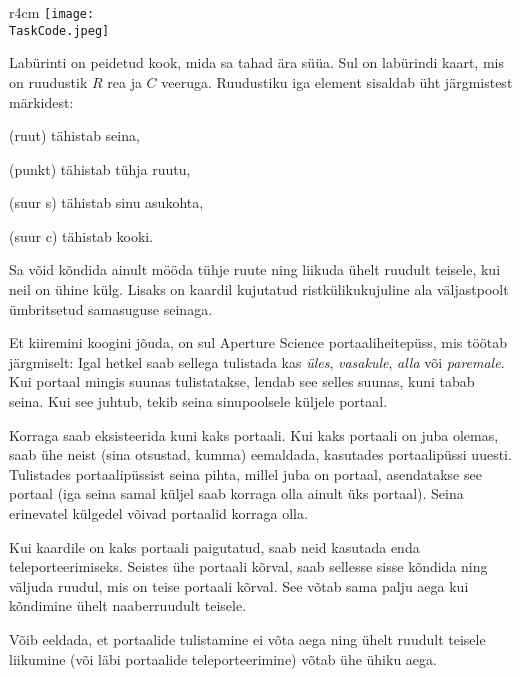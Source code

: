 ﻿\documentclass{boi2014-et}
\renewcommand{\TaskCode}{portals}
\newcommand{\constant}[1]{{\tt #1}}
\begin{document}
    \begin{wrapfigure}[4]{r}{4cm}
        \vspace{-24pt}
        \texttt{[image: \\TaskCode.jpeg]}
    \end{wrapfigure}

    Labürinti on peidetud kook, mida sa tahad ära süüa.
    Sul on labürindi kaart, mis on ruudustik $R$ rea ja $C$ veeruga.
    Ruudustiku iga element sisaldab üht järgmistest märkidest:
    \begin{description}[itemindent=1pt]
        \item[\constant{\#}] (ruut) tähistab seina,
        \item[\constant{.}] (punkt) tähistab tühja ruutu,
        \item[\constant{S}] (suur s) tähistab sinu asukohta,
        \item[\constant{C}] (suur c) tähistab kooki.
    \end{description}

    Sa võid kõndida ainult mööda tühje ruute ning liikuda ühelt ruudult teisele,
    kui neil on ühine külg. Lisaks on kaardil kujutatud ristkülikukujuline ala
    väljastpoolt ümbritsetud samasuguse seinaga.

    Et kiiremini koogini jõuda, on sul Aperture Science\texttrademark{}
    portaaliheitepüss, mis töötab järgmiselt:
    Igal hetkel saab sellega tulistada kas
    \emph{üles}, \emph{vasakule}, \emph{alla} või \emph{paremale}.
    Kui portaal mingis suunas tulistatakse, lendab see selles suunas, kuni tabab seina.
    Kui see juhtub, tekib seina sinupoolsele küljele portaal.

    Korraga saab eksisteerida kuni kaks portaali. Kui kaks portaali on juba olemas,
    saab ühe neist (sina otsustad, kumma) eemaldada, kasutades portaalipüssi uuesti.
    Tulistades portaalipüssist seina pihta, millel juba on portaal, asendatakse see portaal
    (iga seina samal küljel saab korraga olla ainult üks portaal).
    Seina erinevatel külgedel võivad portaalid korraga olla.

    Kui kaardile on kaks portaali paigutatud, saab neid kasutada enda teleporteerimiseks.
    Seistes ühe portaali kõrval, saab sellesse sisse kõndida ning väljuda ruudul,
    mis on teise portaali kõrval. See võtab sama palju aega kui kõndimine ühelt naaberruudult teisele.

    Võib eeldada, et portaalide tulistamine ei võta aega ning ühelt ruudult teisele liikumine
    (või läbi portaalide teleporteerimine) võtab ühe ühiku aega.
\end{document}

